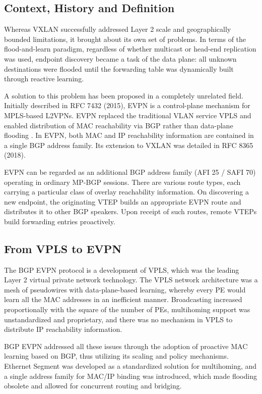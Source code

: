 \subsection{Context, History and Definition}
Whereas VXLAN successfully addressed Layer 2 scale and geographically bounded limitations, it brought about its own set of problems. In terms of the flood-and-learn paradigm, regardless of whether multicast or head-end replication was used, endpoint discovery became a task of the data plane: all unknown destinations were flooded until the forwarding table was dynamically built through reactive learning\cite{IETFRFC7365}.

A solution to this problem has been proposed in a completely unrelated field. Initially described in RFC 7432 (2015), EVPN is a control-plane mechanism for MPLS-based L2VPNs. EVPN replaced the traditional VLAN service VPLS and enabled distribution of MAC reachability via BGP rather than data-plane flooding \cite{IETFRFC7365}. In EVPN, both MAC and IP reachability information are contained in a single BGP address family. Its extension to VXLAN was detailed in RFC 8365 (2018).

EVPN can be regarded as an additional BGP address family (AFI 25 / SAFI 70) operating in ordinary MP-BGP sessions. There are various route types, each carrying a particular class of overlay reachability information. On discovering a new endpoint, the originating VTEP builds an appropriate EVPN route and distributes it to other BGP speakers. Upon receipt of such routes, remote VTEPs build forwarding entries proactively.

\subsection*{From VPLS to EVPN}
The BGP EVPN protocol is a development of VPLS, which was the leading Layer 2 virtual private network technology. The VPLS network architecture was a mesh of pseudowires with data-plane-based learning, whereby every PE would learn all the MAC addresses in an inefficient manner. Broadcasting increased proportionally with the square of the number of PEs, multihoming support was unstandardized and proprietary, and there was no mechanism in VPLS to distribute IP reachability information\cite{IETFRFC8365}.

BGP EVPN addressed all these issues through the adoption of proactive MAC learning based on BGP, thus utilizing its scaling and policy mechanisms. Ethernet Segment was developed as a standardized solution for multihoming, and a single address family for MAC/IP binding was introduced, which made flooding obsolete and allowed for concurrent routing and bridging.

